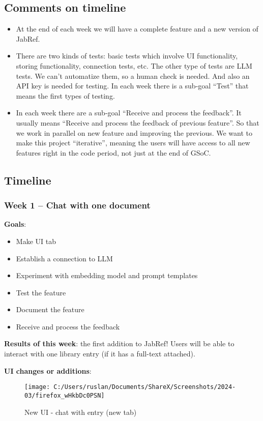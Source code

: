 \documentclass{article}
\begin{document}
	\subsection{Comments on timeline}
	\begin{itemize}
		\item At the end of each week we will have a complete feature and a new version of JabRef.
		\item There are two kinds of tests: basic tests which involve UI functionality, storing functionality, connection tests, etc. The other type of tests are LLM tests. We can't automatize them, so a human check is needed. And also an API key is needed for testing. In each week there is a sub-goal \enquote{Test} that means the first types of testing.
		\item In each week there are a sub-goal \enquote{Receive and process the feedback}. It usually means \enquote{Receive and process the feedback of previous feature}. So that we work in parallel on new feature and improving the previous. We want to make this project \enquote{iterative}, meaning the users will have access to all new features right in the code period, not just at the end of GSoC.
	\end{itemize}
	
	\subsection{Timeline}
	
	\subsubsection{Week 1 -- Chat with one document}
	\textbf{Goals}:
	\begin{itemize}
		\item Make UI tab
		\item Establish a connection to LLM
		\item Experiment with embedding model and prompt templates
		\item Test the feature
		\item Document the feature
		\item Receive and process the feedback
	\end{itemize}
	
	\textbf{Results of this week}: the first addition to JabRef! Users will be able to interact with one library entry (if it has a full-text attached).
	
	\textbf{UI changes or additions}:
	\begin{figure}[H]
		\centering
		\texttt{[image: C:/Users/ruslan/Documents/ShareX/Screenshots/2024-03/firefox\_wHkbDc0PSN]}
		\caption{New UI - chat with entry (new tab)}
		\label{fig:firefoxwhkbdc0psn}
	\end{figure}
	
\end{document}
